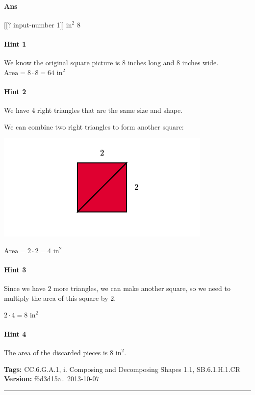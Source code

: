 \documentclass[twocolumn,10pt]{article}
\def\shrinkfactor{0.55}
\begin{document}
\paragraph{Ans}  [[? input-number 1]] $\text{in}^2$  8

\paragraph{Hint 1}We know the original square picture is $8$ inches long and $8$ inches wide.  
${\text{Area}}=8\cdot8=64\text{ in}^2$  

\paragraph{Hint 2}We have 4 right triangles that are the same size and shape.  

We can combine two right triangles to form another square: 


\includegraphics[scale=\shrinkfactor]{figures/8990031770cbd0af85eeed620a6be4bcc4e04b7b.png}      

${\text{Area}}=2\cdot2=4\text{ in}^2$  

\paragraph{Hint 3}Since we have $2$ more triangles, we can make another square, so we need to multiply the area of this square by $2$.  

$2\cdot4=8\text{ in}^2$

\paragraph{Hint 4}The area of the discarded pieces is $8\text{ in}^2$.



\medskip
\noindent
\textbf{Tags:} {\footnotesize CC.6.G.A.1, i.	Composing and Decomposing Shapes 1.1, SB.6.1.H.1.CR}\\
\textbf{Version:} f6d3d15a.. 2013-10-07
\smallskip\hrule
\end{document}
